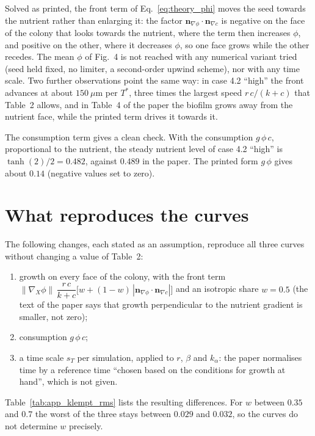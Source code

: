 Solved as printed, the front term of Eq.~\eqref{eq:theory_phi} moves the seed
towards the nutrient rather than enlarging it: the factor
$\mathbf n_{\nabla\phi}\cdot\mathbf n_{\nabla c}$ is negative on the face of
the colony that looks towards the nutrient, where the term then increases $\phi$,
and positive on the other, where it decreases $\phi$, so one
face grows while the other recedes. The mean $\phi$ of Fig.~4 is not reached
with any numerical variant tried (seed held fixed, no limiter, a second-order
upwind scheme), nor with any time scale. Two further observations point the
same way: in case 4.2 ``high'' the front advances at about $150~\mu$m per
$T^*$, three times the largest speed $r\,c/(k+c)$ that Table~2 allows, and in
Table~4 of the paper the biofilm grows away from the nutrient face, while the
printed term drives it towards it.

The consumption term gives a clean check. With the consumption
$g\,\phi\,c$, proportional to the nutrient, the steady nutrient level of
case 4.2 ``high'' is $\tanh(2)/2=0.482$, against $0.489$ in the paper. The
printed form $g\,\phi$ gives about $0.14$ (negative values set to zero).

\section{What reproduces the curves}

The following changes, each stated as an assumption, reproduce all three
curves without changing a value of Table~2:
\begin{enumerate}
  \item growth on every face of the colony, with the front term
        $\|\nabla_X\phi\|\,\dfrac{r\,c}{k+c}\bigl[w+(1-w)\,|\mathbf n_{\nabla\phi}\cdot\mathbf n_{\nabla c}|\bigr]$
        and an isotropic share $w=0.5$ (the text of the paper says that growth
        perpendicular to the nutrient gradient is smaller, not zero);
  \item consumption $g\,\phi\,c$;
  \item a time scale $s_T$ per simulation, applied to $r$, $\beta$ and
        $k_\alpha$: the paper normalises time by a reference time ``chosen
        based on the conditions for growth at hand'', which is not given.
\end{enumerate}
Table~\ref{tab:app_klempt_rms} lists the resulting differences. For $w$
between $0.35$ and $0.7$ the worst of the three stays between $0.029$ and
$0.032$, so the curves do not determine $w$ precisely.

